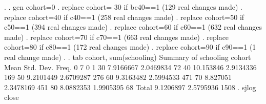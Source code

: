. 
.  gen cohort=0
{\smallskip}
.  replace cohort= 30 if bc40==1
(129 real changes made)
{\smallskip}
.  replace cohort=40 if c40==1
(258 real changes made)
{\smallskip}
.  replace cohort=50 if c50==1
(394 real changes made)
{\smallskip}
.  replace cohort=60 if c60==1
(632 real changes made)
{\smallskip}
.  replace cohort=70 if c70==1
(663 real changes made)
{\smallskip}
.  replace cohort=80 if c80==1
(172 real changes made)
{\smallskip}
.  replace cohort=90 if c90==1
(1 real change made)
{\smallskip}
.  
.  tab cohort, sum(schooling)
{\smallskip}
            {\VBAR}        Summary of schooling
     cohort {\VBAR}        Mean   Std. Dev.       Freq.
          0 {\VBAR}           7           0           1
         30 {\VBAR}   7.9166667   2.0469834          72
         40 {\VBAR}   10.153846   2.9134336         169
         50 {\VBAR}   9.2101449   2.6709287         276
         60 {\VBAR}   9.3163482   2.5994533         471
         70 {\VBAR}    8.827051   2.3478169         451
         80 {\VBAR}   8.0882353   1.9905395          68
      Total {\VBAR}   9.1206897   2.5795936        1508
{\smallskip}
.  sjlog close
{\smallskip}
